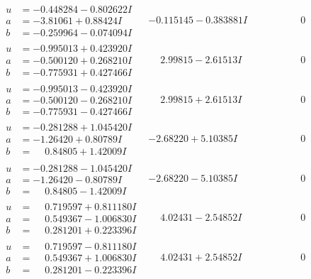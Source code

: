 \documentclass[1p]{elsarticle_modified}
\theoremstyle{definition}
\begin{document}
$$\begin{array}{c|c|c}
\begin{aligned}
u &= -0.448284 - 0.802622 I \\
a &= -3.81061 + 0.88424 I \\
b &= -0.259964 - 0.074094 I\end{aligned}
 & -0.115145 - 0.383881 I & \phantom{-0.000000 } 0 \\ \hline\begin{aligned}
u &= -0.995013 + 0.423920 I \\
a &= -0.500120 + 0.268210 I \\
b &= -0.775931 + 0.427466 I\end{aligned}
 & \phantom{-}2.99815 - 2.61513 I & \phantom{-0.000000 } 0 \\ \hline\begin{aligned}
u &= -0.995013 - 0.423920 I \\
a &= -0.500120 - 0.268210 I \\
b &= -0.775931 - 0.427466 I\end{aligned}
 & \phantom{-}2.99815 + 2.61513 I & \phantom{-0.000000 } 0 \\ \hline\begin{aligned}
u &= -0.281288 + 1.045420 I \\
a &= -1.26420 + 0.80789 I \\
b &= \phantom{-}0.84805 + 1.42009 I\end{aligned}
 & -2.68220 + 5.10385 I & \phantom{-0.000000 } 0 \\ \hline\begin{aligned}
u &= -0.281288 - 1.045420 I \\
a &= -1.26420 - 0.80789 I \\
b &= \phantom{-}0.84805 - 1.42009 I\end{aligned}
 & -2.68220 - 5.10385 I & \phantom{-0.000000 } 0 \\ \hline\begin{aligned}
u &= \phantom{-}0.719597 + 0.811180 I \\
a &= \phantom{-}0.549367 - 1.006830 I \\
b &= \phantom{-}0.281201 + 0.223396 I\end{aligned}
 & \phantom{-}4.02431 - 2.54852 I & \phantom{-0.000000 } 0 \\ \hline\begin{aligned}
u &= \phantom{-}0.719597 - 0.811180 I \\
a &= \phantom{-}0.549367 + 1.006830 I \\
b &= \phantom{-}0.281201 - 0.223396 I\end{aligned}
 & \phantom{-}4.02431 + 2.54852 I & \phantom{-0.000000 } 0\\

\end{array}$$
\end{document}

